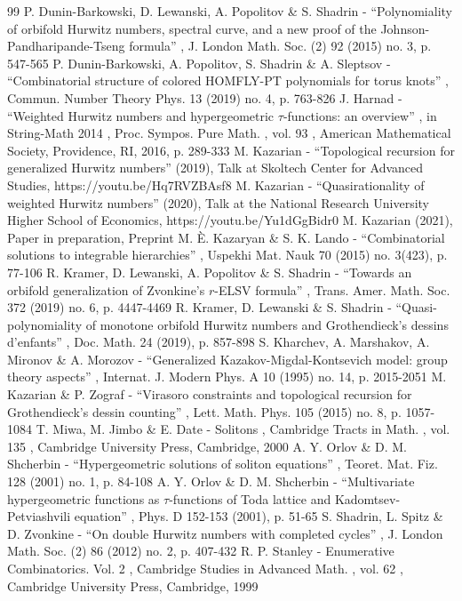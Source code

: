 \documentclass[11pt]{article}
\theoremstyle{plain}
\theoremstyle{definition}
\theoremstyle{remark}
\begin{document}
\begin{thebibliography}{99}
 P. Dunin-Barkowski, D. Lewanski, A. Popolitov \& S. Shadrin - “Polynomiality of orbifold Hurwitz numbers, spectral curve, and a new proof of the Johnson-Pandharipande-Tseng formula” , J. London Math. Soc. (2) 92 (2015) no. 3, p. 547-565
 P. Dunin-Barkowski, A. Popolitov, S. Shadrin \& A. Sleptsov - “Combinatorial structure of colored HOMFLY-PT polynomials for torus knots” , Commun. Number Theory Phys. 13 (2019) no. 4, p. 763-826
 J. Harnad - “Weighted Hurwitz numbers and hypergeometric $\tau $-functions: an overview” , in String-Math 2014 , Proc. Sympos. Pure Math. , vol. 93 , American Mathematical Society, Providence, RI, 2016, p. 289-333
 M. Kazarian - “Topological recursion for generalized Hurwitz numbers” (2019), Talk at Skoltech Center for Advanced Studies, https://youtu.be/Hq7RVZBAsf8
 M. Kazarian - “Quasirationality of weighted Hurwitz numbers” (2020), Talk at the National Research University Higher School of Economics, https://youtu.be/Yu1dGgBidr0
 M. Kazarian (2021), Paper in preparation, Preprint
 M. È. Kazaryan \& S. K. Lando - “Combinatorial solutions to integrable hierarchies” , Uspekhi Mat. Nauk 70 (2015) no. 3(423), p. 77-106
 R. Kramer, D. Lewanski, A. Popolitov \& S. Shadrin - “Towards an orbifold generalization of Zvonkine’s $r$-ELSV formula” , Trans. Amer. Math. Soc. 372 (2019) no. 6, p. 4447-4469
 R. Kramer, D. Lewanski \& S. Shadrin - “Quasi-polynomiality of monotone orbifold Hurwitz numbers and Grothendieck’s dessins d’enfants” , Doc. Math. 24 (2019), p. 857-898
 S. Kharchev, A. Marshakov, A. Mironov \& A. Morozov - “Generalized Kazakov-Migdal-Kontsevich model: group theory aspects” , Internat. J. Modern Phys. A 10 (1995) no. 14, p. 2015-2051
 M. Kazarian \& P. Zograf - “Virasoro constraints and topological recursion for Grothendieck’s dessin counting” , Lett. Math. Phys. 105 (2015) no. 8, p. 1057-1084
 T. Miwa, M. Jimbo \& E. Date - Solitons , Cambridge Tracts in Math. , vol. 135 , Cambridge University Press, Cambridge, 2000
 A. Y. Orlov \& D. M. Shcherbin - “Hypergeometric solutions of soliton equations” , Teoret. Mat. Fiz. 128 (2001) no. 1, p. 84-108
 A. Y. Orlov \& D. M. Shcherbin - “Multivariate hypergeometric functions as $\tau $-functions of Toda lattice and Kadomtsev-Petviashvili equation” , Phys. D 152-153 (2001), p. 51-65
 S. Shadrin, L. Spitz \& D. Zvonkine - “On double Hurwitz numbers with completed cycles” , J. London Math. Soc. (2) 86 (2012) no. 2, p. 407-432
 R. P. Stanley - Enumerative Combinatorics. Vol. 2 , Cambridge Studies in Advanced Math. , vol. 62 , Cambridge University Press, Cambridge, 1999
\end{thebibliography}
\end{document}
